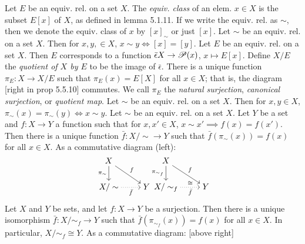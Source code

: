  Let $E$ be an equiv. rel. on a set $X$. The \textit{equiv. class} of an elem. $x \in X$ is the subset $E[x]$ of $X$, as defined in lemma 5.1.11. If we write the equiv. rel. as $\sim$, then we denote the equiv. class of $x$ by $[x]_{\sim}$ or just $[x]$.
 Let $\sim$ be an equiv. rel. on a set $X$. Then for $x, y, \in X$, $x \sim y \iff [x] = [y]$.
 Let $E$ be an equiv. rel. on a set $X$. Then $E$ corresponds to a function $\bar{\epsilon} X \to \operatorname{\mathscr{P}}(x)$, $x \mapsto E[x]$. Define $X/E$ the \textit{quotient of $X$ by $E$} to be the image of $\bar{\epsilon}$.
 There is a unique function $\pi_E \colon X \to X/E$ such that $\pi_E(x) = E[X]$ for all $x \in X$; that is, the diagram [right in prop 5.5.10] commutes. We call $\pi_E$ the \textit{natural surjection}, \textit{canonical surjection}, or \textit{quotient map}.
 Let $\sim$ be an equiv. rel. on a set $X$. Then for $x, y \in X$, $\pi_{\sim}(x) = \pi_{\sim}(y) \iff x \sim y$.
 Let $\sim$ be an equiv. rel. on a set $X$. Let $Y$ be a set and $f \colon X \to Y$ a function such that for $x, x' \in X$, $x \sim x' \implies f(x) = f(x')$. Then there is a unique function $\bar{f} \colon X/\sim \to Y$ such that $\bar{f}(\pi_{\sim}(x)) = f(x)$ for all $x \in X$. As a commutative diagram (left):
\[\begin{tikzcd}[cramped]
    X \\
    {X/\sim} & Y
    \arrow["{\pi_{\sim}}"', from=1-1, to=2-1]
    \arrow["f", from=1-1, to=2-2]
    \arrow["{\bar{f}}"', dotted, from=2-1, to=2-2]
\end{tikzcd}
\begin{tikzcd}[cramped]
    X \\
    {X/\sim_f} & Y
    \arrow["{\pi_{\sim_f}}"', from=1-1, to=2-1]
    \arrow["f", from=1-1, to=2-2]
    \arrow["{\bar{f}}"', "\cong", dotted, from=2-1, to=2-2]
\end{tikzcd}\]
 Let $X$ and $Y$ be sets, and let $f \colon X \to Y$ be a surjection. Then there is a unique isomorphism $\bar{f} \colon X/\sim_f \to Y$ such that $\bar{f}(\pi_{\sim_f}(x)) = f(x)$ for all $x \in X$. In particular, $X/\sim_f \cong Y$. As a commutative diagram: [above right]
